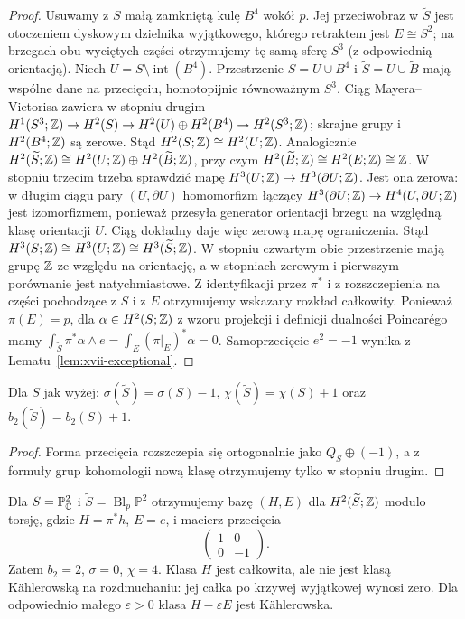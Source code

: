 \begin{proof}
Usuwamy z $S$ małą zamkniętą kulę $B^4$ wokół $p$.
Jej przeciwobraz w $\widetilde S$ jest otoczeniem dyskowym
dzielnika wyjątkowego, którego retraktem jest $E\cong S^2$;
na brzegach obu wyciętych części otrzymujemy tę samą
sferę $S^3$ (z odpowiednią orientacją).
Niech $U=S\setminus\operatorname{int}(B^4)$.
Przestrzenie $S=U\cup B^4$ i
$\widetilde S=U\cup\widetilde B$
mają wspólne dane na przecięciu, homotopijnie równoważnym
$S^3$. Ciąg Mayera--Vietorisa zawiera w stopniu drugim
$H^1(S^3;\mathbb{Z})\to H^2(S)\to H^2(U)\oplus H^2(B^4)
\to H^2(S^3;\mathbb{Z})$; skrajne grupy i $H^2(B^4;\mathbb{Z})$
są zerowe. Stąd $H^2(S;\mathbb{Z})\cong H^2(U;\mathbb{Z})$.
Analogicznie $H^2(\widetilde S;\mathbb{Z})\cong
H^2(U;\mathbb{Z})\oplus H^2(\widetilde B;\mathbb{Z})$, przy czym
$H^2(\widetilde B;\mathbb{Z})\cong H^2(E;\mathbb{Z})\cong\mathbb{Z}$.
W stopniu trzecim trzeba sprawdzić mapę
$H^3(U;\mathbb{Z})\to H^3(\partial U;\mathbb{Z})$.
Jest ona zerowa: w długim ciągu pary $(U,\partial U)$
homomorfizm łączący
$H^3(\partial U;\mathbb{Z})\to H^4(U,\partial U;\mathbb{Z})$
jest izomorfizmem, ponieważ przesyła generator
orientacji brzegu na względną klasę orientacji $U$.
Ciąg dokładny daje więc zerową mapę ograniczenia.
Stąd $H^3(S;\mathbb{Z})\cong H^3(U;\mathbb{Z})\cong H^3(\widetilde S;\mathbb{Z})$.
W stopniu czwartym obie przestrzenie mają grupę $\mathbb{Z}$
ze względu na orientację, a w stopniach zerowym i pierwszym
porównanie jest natychmiastowe.
Z identyfikacji przez $\pi^*$ i z rozszczepienia
na części pochodzące z $S$ i z $E$ otrzymujemy
wskazany rozkład całkowity.
Ponieważ $\pi(E)=p$, dla $\alpha\in H^2(S;\mathbb{Z})$
z wzoru projekcji i definicji dualności Poincarégo mamy
$\int_{\widetilde S}\pi^*\alpha\wedge e
=\int_E(\pi|_E)^*\alpha=0$.
Samoprzecięcie $e^2=-1$ wynika z Lematu~\ref{lem:xvii-exceptional}.
\end{proof}
\begin{wniosek}
Dla $S$ jak wyżej:
$\sigma(\widetilde S)=\sigma(S)-1$,
$\chi(\widetilde S)=\chi(S)+1$ oraz
$b_2(\widetilde S)=b_2(S)+1$.
\end{wniosek}
\begin{proof}
Forma przecięcia rozszczepia się ortogonalnie jako
$Q_S\oplus(-1)$, a z formuły grup kohomologii
nową klasę otrzymujemy tylko w stopniu drugim.
\end{proof}
\begin{przyklad}
Dla $S=\mathbb P^2_{\mathbb{C}}$ i
$\widetilde S=\operatorname{Bl}_p\mathbb P^2$ otrzymujemy bazę
$(H,E)$ dla $H^2(\widetilde S;\mathbb{Z})$ modulo torsję,
gdzie $H=\pi^*h$, $E=e$, i macierz przecięcia
\[
\begin{pmatrix}1&0\\0&-1\end{pmatrix}.
\]
Zatem $b_2=2$, $\sigma=0$, $\chi=4$.
Klasa $H$ jest całkowita, ale nie jest klasą Kählerowską
na rozdmuchaniu: jej całka po krzywej wyjątkowej wynosi zero.
Dla odpowiednio małego $\varepsilon>0$ klasa
$H-\varepsilon E$ jest Kählerowska.
\end{przyklad}

